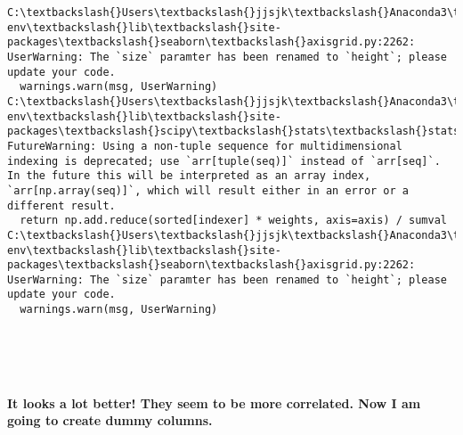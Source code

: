 \documentclass[11pt]{article}
\begin{document}
    \begin{Verbatim}[commandchars=\\\{\}]
C:\textbackslash{}Users\textbackslash{}jjsjk\textbackslash{}Anaconda3\textbackslash{}envs\textbackslash{}learn-env\textbackslash{}lib\textbackslash{}site-packages\textbackslash{}seaborn\textbackslash{}axisgrid.py:2262: UserWarning: The `size` paramter has been renamed to `height`; please update your code.
  warnings.warn(msg, UserWarning)
C:\textbackslash{}Users\textbackslash{}jjsjk\textbackslash{}Anaconda3\textbackslash{}envs\textbackslash{}learn-env\textbackslash{}lib\textbackslash{}site-packages\textbackslash{}scipy\textbackslash{}stats\textbackslash{}stats.py:1713: FutureWarning: Using a non-tuple sequence for multidimensional indexing is deprecated; use `arr[tuple(seq)]` instead of `arr[seq]`. In the future this will be interpreted as an array index, `arr[np.array(seq)]`, which will result either in an error or a different result.
  return np.add.reduce(sorted[indexer] * weights, axis=axis) / sumval
C:\textbackslash{}Users\textbackslash{}jjsjk\textbackslash{}Anaconda3\textbackslash{}envs\textbackslash{}learn-env\textbackslash{}lib\textbackslash{}site-packages\textbackslash{}seaborn\textbackslash{}axisgrid.py:2262: UserWarning: The `size` paramter has been renamed to `height`; please update your code.
  warnings.warn(msg, UserWarning)

    \end{Verbatim}

    \begin{center}
    \end{center}
    { \hspace*{\fill} \\}
    
    \begin{center}
    \end{center}
    { \hspace*{\fill} \\}
    
    \paragraph{It looks a lot better! They seem to be more correlated. Now I
am going to create dummy
columns.}\label{it-looks-a-lot-better-they-seem-to-be-more-correlated.-now-i-am-going-to-create-dummy-columns.}
\end{document}
